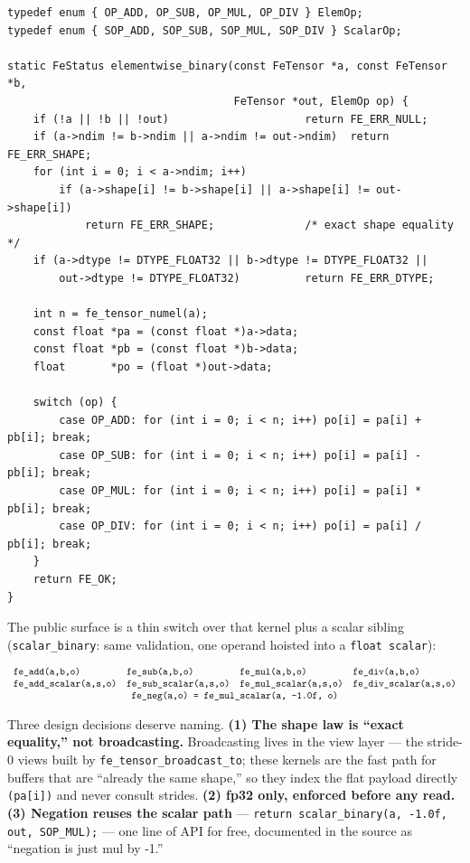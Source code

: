 \documentclass[11pt,a4paper]{article}
\begin{document}
\begin{lstlisting}[style=cstyle,caption={ops/elementwise.c --- the binary kernel}]
typedef enum { OP_ADD, OP_SUB, OP_MUL, OP_DIV } ElemOp;
typedef enum { SOP_ADD, SOP_SUB, SOP_MUL, SOP_DIV } ScalarOp;

static FeStatus elementwise_binary(const FeTensor *a, const FeTensor *b,
                                   FeTensor *out, ElemOp op) {
    if (!a || !b || !out)                     return FE_ERR_NULL;
    if (a->ndim != b->ndim || a->ndim != out->ndim)  return FE_ERR_SHAPE;
    for (int i = 0; i < a->ndim; i++)
        if (a->shape[i] != b->shape[i] || a->shape[i] != out->shape[i])
            return FE_ERR_SHAPE;              /* exact shape equality */
    if (a->dtype != DTYPE_FLOAT32 || b->dtype != DTYPE_FLOAT32 ||
        out->dtype != DTYPE_FLOAT32)          return FE_ERR_DTYPE;

    int n = fe_tensor_numel(a);
    const float *pa = (const float *)a->data;
    const float *pb = (const float *)b->data;
    float       *po = (float *)out->data;

    switch (op) {
        case OP_ADD: for (int i = 0; i < n; i++) po[i] = pa[i] + pb[i]; break;
        case OP_SUB: for (int i = 0; i < n; i++) po[i] = pa[i] - pb[i]; break;
        case OP_MUL: for (int i = 0; i < n; i++) po[i] = pa[i] * pb[i]; break;
        case OP_DIV: for (int i = 0; i < n; i++) po[i] = pa[i] / pb[i]; break;
    }
    return FE_OK;
}
\end{lstlisting}

The public surface is a thin switch over that kernel plus a scalar sibling
(\texttt{scalar\_binary}: same validation, one operand hoisted into a
\texttt{float scalar}):

\[
\begin{array}{llll}
\texttt{fe\_add(a,b,o)} & \texttt{fe\_sub(a,b,o)} & \texttt{fe\_mul(a,b,o)} & \texttt{fe\_div(a,b,o)} \\
\texttt{fe\_add\_scalar(a,s,o)} & \texttt{fe\_sub\_scalar(a,s,o)} & \texttt{fe\_mul\_scalar(a,s,o)} & \texttt{fe\_div\_scalar(a,s,o)}\\
\multicolumn{4}{c}{\texttt{fe\_neg(a,o) = fe\_mul\_scalar(a,~-1.0f,~o)}}
\end{array}
\]

Three design decisions deserve naming. \textbf{(1) The shape law is ``exact
equality,'' not broadcasting.} Broadcasting lives in the view layer --- the
stride-0 views built by \texttt{fe\_tensor\_broadcast\_to}; these kernels are
the fast path for buffers that
are ``already the same shape,'' so they index the flat payload directly
\texttt{(pa[i])} and never consult strides. \textbf{(2) fp32 only, enforced
before any read.} \textbf{(3) Negation reuses the scalar path} ---
\texttt{return scalar\_binary(a, -1.0f, out, SOP\_MUL);} ---
one line of API for free, documented in the source as ``negation is just
mul by -1.''
\end{document}
